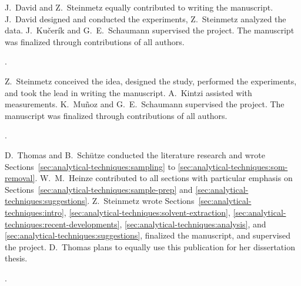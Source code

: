 \begin{description}
	\setlength\itemsep{0em}
	\item[Author contributions:] J.~David and Z.~Steinmetz equally contributed to writing the manuscript. J.~David designed and conducted the experiments, Z.~Steinmetz analyzed the data. J.~Kučerík and G.~E.~Schaumann supervised the project. The manuscript was finalized through contributions of all authors.
\end{description}

\vspace{0.5\baselineskip}
\noindent{}.

\begin{description}
	\setlength\itemsep{0em}
	\item[Author contributions:] Z.~Steinmetz conceived the idea, designed the study, performed the experiments, and took the lead in writing the manuscript. A.~Kintzi assisted with measurements. K.~Muñoz and G.~E.~Schaumann supervised the project. The manuscript was finalized through contributions of all authors.
\end{description}

\vspace{0.5\baselineskip}
\noindent{}.

\begin{description}
	\setlength\itemsep{0em}
	\item[Author contributions:] D.~Thomas and B.~Schütze conducted the literature research and wrote Sections~\ref{sec:analytical-techniques:sampling} to \ref{sec:analytical-techniques:som-removal}. W.~M.~Heinze contributed to all sections with particular emphasis on Sections~\ref{sec:analytical-techniques:sample-prep} and \ref{sec:analytical-techniques:suggestions}. Z.~Steinmetz wrote Sections~\ref{sec:analytical-techniques:intro}, \ref{sec:analytical-techniques:solvent-extraction}, \ref{sec:analytical-techniques:recent-developments}, \ref{sec:analytical-techniques:analysis}, and \ref{sec:analytical-techniques:suggestions}, finalized the manuscript, and supervised the project. D.~Thomas plans to equally use this publication for her dissertation thesis.
\end{description}

\vspace{0.5\baselineskip}
\noindent{}.

